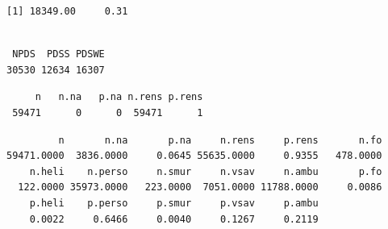 \documentclass[]{article}
\newenvironment{Shaded}{\begin{snugshade}}{\end{snugshade}}
\newcommand{\KeywordTok}[1]{\textcolor[rgb]{0.13,0.29,0.53}{\textbf{{#1}}}}
\newcommand{\StringTok}[1]{\textcolor[rgb]{0.31,0.60,0.02}{{#1}}}
\newcommand{\CommentTok}[1]{\textcolor[rgb]{0.56,0.35,0.01}{\textit{{#1}}}}
\newcommand{\NormalTok}[1]{{#1}}
\begin{document}
\begin{Shaded}
\end{Shaded}

\begin{verbatim}
[1] 18349.00     0.31
\end{verbatim}

\begin{Shaded}
\end{Shaded}

\begin{verbatim}

 NPDS  PDSS PDSWE 
30530 12634 16307 
\end{verbatim}

\begin{Shaded}
\end{Shaded}

\begin{verbatim}
     n   n.na   p.na n.rens p.rens 
 59471      0      0  59471      1 
\end{verbatim}

\begin{Shaded}
\end{Shaded}

\begin{verbatim}
         n       n.na       p.na     n.rens     p.rens       n.fo 
59471.0000  3836.0000     0.0645 55635.0000     0.9355   478.0000 
    n.heli    n.perso     n.smur     n.vsav     n.ambu       p.fo 
  122.0000 35973.0000   223.0000  7051.0000 11788.0000     0.0086 
    p.heli    p.perso     p.smur     p.vsav     p.ambu 
    0.0022     0.6466     0.0040     0.1267     0.2119 
\end{verbatim}
\end{document}
